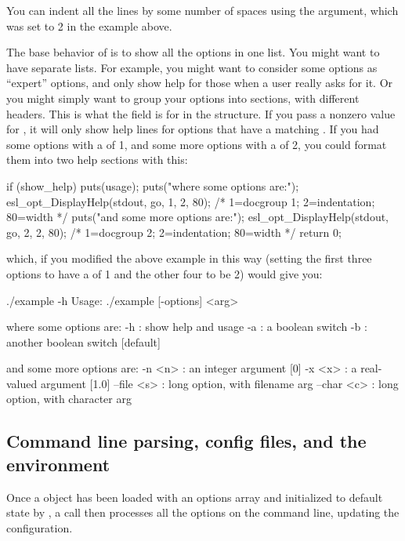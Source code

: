 You can indent all the lines by some number of spaces using the
 argument, which was set to 2 in the example above.


The base behavior of  is to show all
the options in one list. You might want to have separate lists. For
example, you might want to consider some options as ``expert''
options, and only show help for those when a user really asks for it.
Or you might simply want to group your options into sections, with
different headers. This is what the  field is for
in the  structure. If you pass
 a nonzero value for ,
it will only show help lines for options that have a matching
. If you had some options with a
 of 1, and some more options with a 
 of 2, you could format them into two help sections
with this:

\begin{cchunk}
 if (show_help) {
    puts(usage); 
    puts("\n  where some options are:");
    esl_opt_DisplayHelp(stdout, go, 1, 2, 80); /* 1=docgroup 1; 2=indentation; 80=width */
    puts("\n  and some more options are:");
    esl_opt_DisplayHelp(stdout, go, 2, 2, 80); /* 1=docgroup 2; 2=indentation; 80=width */
    return 0;
  }
\end{cchunk}

which, if you modified the above example in this way (setting the
first three options to have a  of 1 and the other
four to be 2) would give you:

\begin{cchunk}
./example -h
Usage: ./example [-options] <arg>

  where some options are:
  -h : show help and usage
  -a : a boolean switch
  -b : another boolean switch  [default]

  and some more options are:
  -n <n>     : an integer argument  [0]
  -x <x>     : a real-valued argument  [1.0]
  --file <s> : long option, with filename arg
  --char <c> : long option, with character arg
\end{cchunk}




\subsection{Command line parsing, config files, and the environment}

Once a  object has been loaded with an options
array and initialized to default state by
, a 
call then processes all the options on the command line, updating the
configuration. 

